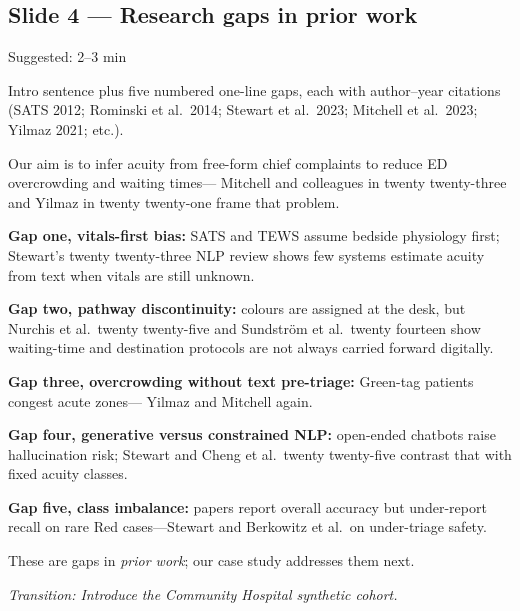 \documentclass[11pt]{article}
\newcommand{\transition}[1]{\medskip\noindent\textit{\textcolor{knustMuted}{Transition: #1}}\medskip}
\newcommand{\deck}[1]{{\small\texttt{\textcolor{knustMuted}{main.pdf slide: #1}}}}
\newcommand{\slide}[3]{%
  \subsection{Slide #1 --- #2}%
  \noindent\deck{#1 --- #3}\par\smallskip}
\begin{document}
\slide{4}{Research gaps in prior work}{Research gaps}
\begin{timing}Suggested: 2--3 min\end{timing}
\begin{onscreen}
Intro sentence plus five numbered one-line gaps, each with author--year citations
(SATS 2012; Rominski et al.\ 2014; Stewart et al.\ 2023; Mitchell et al.\ 2023; Yilmaz 2021; etc.).
\end{onscreen}
\begin{saybox}
Our aim is to infer acuity from free-form chief complaints to reduce ED overcrowding and waiting times---
Mitchell and colleagues in twenty twenty-three and Yilmaz in twenty twenty-one frame that problem.

\textbf{Gap one, vitals-first bias:} SATS and TEWS assume bedside physiology first; Stewart's twenty
twenty-three NLP review shows few systems estimate acuity from text when vitals are still unknown.

\textbf{Gap two, pathway discontinuity:} colours are assigned at the desk, but Nurchis et al.\ twenty
twenty-five and Sundstr\"om et al.\ twenty fourteen show waiting-time and destination protocols are
not always carried forward digitally.

\textbf{Gap three, overcrowding without text pre-triage:} Green-tag patients congest acute zones---
Yilmaz and Mitchell again.

\textbf{Gap four, generative versus constrained NLP:} open-ended chatbots raise hallucination risk;
Stewart and Cheng et al.\ twenty twenty-five contrast that with fixed acuity classes.

\textbf{Gap five, class imbalance:} papers report overall accuracy but under-report recall on rare
Red cases---Stewart and Berkowitz et al.\ on under-triage safety.

These are gaps in \emph{prior work}; our case study addresses them next.
\end{saybox}
\transition{Introduce the Community Hospital synthetic cohort.}
\end{document}
